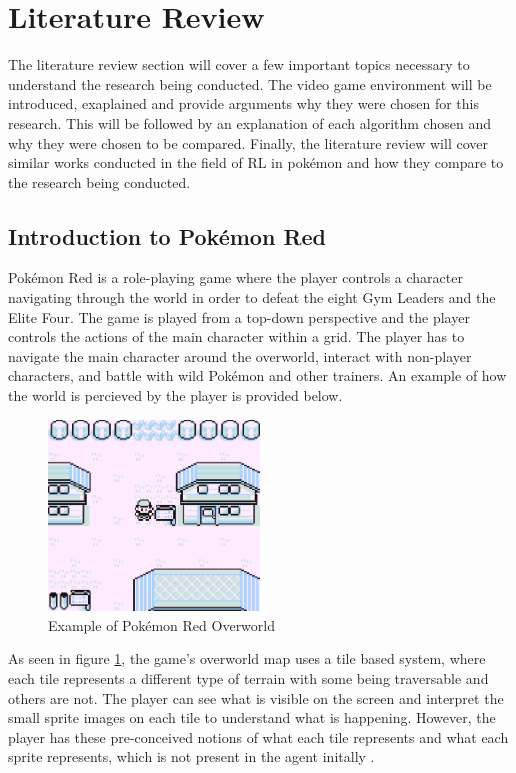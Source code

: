 \section{Literature Review}

The literature review section will cover a few important topics necessary to understand the research being conducted. The video game environment will be introduced, exaplained and provide arguments why they were chosen for this research. This will be followed by an explanation of each algorithm chosen and why they were chosen to be compared. Finally, the literature review will cover similar works conducted in the field of RL in pokémon and how they compare to the research being conducted.

\subsection{Introduction to Pokémon Red}

Pokémon Red is a role-playing game where the player controls a character navigating through the world in order to defeat the eight Gym Leaders and the Elite Four. The game is played from a top-down perspective and the player controls the actions of the main character within a grid. The player has to navigate the main character around the overworld, interact with non-player characters, and battle with wild Pokémon and other trainers. An example of how the world is percieved by the player is provided below\cite{HubZ_1998}. 

\begin{figure}[H]
    \centering
    \includegraphics[width=0.5\textwidth]{figures/red_pallet_town.png}
    \caption{Example of Pokémon Red Overworld}
    \label{fig:pkmn_overworld}
\end{figure}

As seen in figure \ref{fig:pkmn_overworld}, the game's overworld map uses a tile based system, where each tile represents a different type of terrain with some being traversable and others are not. The player can see what is visible on the screen and interpret the small sprite images on each tile to understand what is happening. However, the player has these pre-conceived notions of what each tile represents and what each sprite represents, which is not present in the agent initally \cite{HubZ_1998}. 

